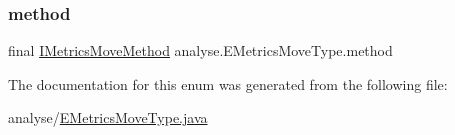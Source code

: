 \mbox{\label{enumanalyse_1_1_e_metrics_move_type_a003d08d23ab5a57a6736c1d1a13baa33}} 
\subsubsection{\texorpdfstring{method}{method}}
{\footnotesize\ttfamily final \mbox{\hyperlink{interfaceanalyse_1_1move_methods_1_1_i_metrics_move_method}{I\+Metrics\+Move\+Method}} analyse.\+E\+Metrics\+Move\+Type.\+method\hspace{0.3cm}{\ttfamily [private]}}



The documentation for this enum was generated from the following file\+:\begin{DoxyCompactItemize}
\item 
analyse/\mbox{\hyperlink{_e_metrics_move_type_8java}{E\+Metrics\+Move\+Type.\+java}}\end{DoxyCompactItemize}
